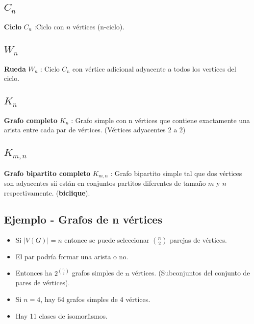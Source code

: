 \documentclass[a4paper]{book}
\begin{document}
\subsection{\(C_{n}\)}
\label{ssec:cn}

\textbf{Ciclo} \(C_{n}\) :Ciclo con \(n\) vértices (n-ciclo).

\subsection{\(W_{n}\)}
\label{ssec:wn}

\textbf{Rueda} \(W_{n}\) : Ciclo \(C_{n}\) con vértice adicional adyacente a
todos los vertices del ciclo.

\subsection{\(K_{n}\)}
\label{ssec:kn}

\textbf{Grafo completo} \(K_{n}\) : Grafo simple con n vértices que contiene
exactamente una arista entre cada par de vértices. (Vértices adyacentes 2 a 2)

\subsection{\(K_{m,n}\)}
\label{ssec:kmn}

\textbf{Grafo bipartito completo} \(K_{m,n}\) : Grafo bipartito simple tal que dos vértices son adyacentes sii están en conjuntos partitos diferentes de tamaño \(m\) y \(n\) respectivamente. (\textbf{biclique}).

\subsection{Ejemplo - Grafos de n vértices}
\label{ssec:ejemplo_grafos_de_n_vertices}

\begin{itemize}
    \item Si \(|V\left( G \right)|=n \) entonce se puede seleccionar
        \({n}\choose{2}\) parejas de vértices.
    \item El par podría formar una arista o no.
    \item Entonces ha \(2^{{n}\choose{2}}\) grafos simples de  \(n\) vértices. (Subconjuntos del conjunto de pares de vértices).
    \item Si \(n=4\), hay 64 grafos simples de 4 vértices.
        \item Hay 11 clases de isomorfismos.
\end{itemize}
\end{document}
